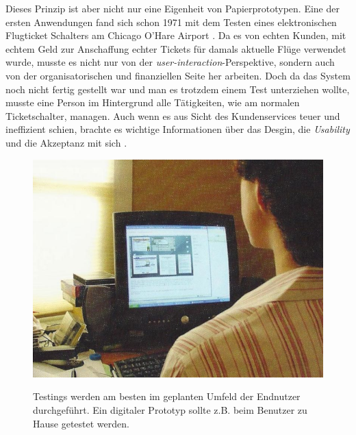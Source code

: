 \medskip Dieses Prinzip ist aber nicht nur eine Eigenheit von Papierprototypen. Eine der ersten Anwendungen fand sich schon 1971 mit dem Testen eines elektronischen Flugticket Schalters am Chicago O’Hare Airport \citep{Erdmann:1971}. Da es von echten Kunden, mit echtem Geld zur Anschaffung echter Tickets für damals aktuelle Flüge verwendet wurde, musste es nicht nur von der \emph{user-interaction}-Perspektive, sondern auch von der organisatorischen und finanziellen Seite her arbeiten. Doch da das System noch nicht fertig gestellt war und man es trotzdem einem Test unterziehen wollte, musste eine Person im Hintergrund alle Tätigkeiten, wie am normalen Ticketschalter, managen. Auch wenn es aus Sicht des Kundenservices teuer und ineffizient schien, brachte es wichtige Informationen über das Desgin, die \emph{Usability} und die Akzeptanz mit sich \citep{Buxton:2007}.

\begin{figure}
	\begin{center}
        {\includegraphics[width=\linewidth]{gfx/safferUserTesting}}
	\end{center}
		\caption[(User) Testing \newline \citep{Saffer:2007}]{Testings werden am besten im geplanten Umfeld der Endnutzer durchgeführt. Ein digitaler Prototyp sollte z.B. beim Benutzer zu Hause getestet werden.}\label{fig:safferUserTesting}
\end{figure}

